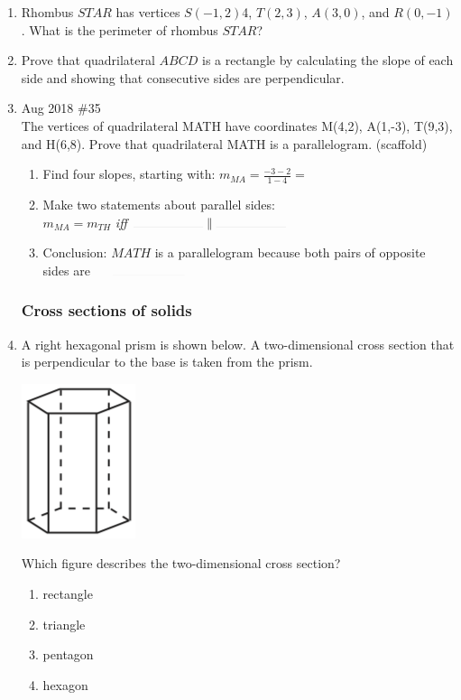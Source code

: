 \documentclass[12pt, oneside]{article}
\begin{document}
\begin{enumerate}[itemsep=0cm]
\item Rhombus $STAR$ has vertices $S(-1,2)$4, $T(2,3)$, $A(3,0)$, and $R(0,-1)$. What is the perimeter of rhombus $STAR$?
    
\item Prove that quadrilateral $ABCD$ is a rectangle by calculating the slope of each side and showing that consecutive sides are perpendicular.

\item Aug 2018 \#35\\
The vertices of quadrilateral MATH have coordinates M(4,2), A(1,-3), T(9,3), and H(6,8). Prove that quadrilateral MATH is a parallelogram.
(scaffold)
  \begin{enumerate}
    \item Find four slopes, starting with: $\displaystyle m_{MA}=\frac{-3-2}{1-4}=$
    \item Make two statements about parallel sides:\\
    $ m_{MA} = m_{TH}$ \emph{iff} $\rule{2cm}{0.015mm} \parallel \rule{2cm}{0.015mm}$ %
    \item Conclusion: $MATH$ is a parallelogram because both pairs of opposite sides are $\rule{3cm}{0.015mm}$
\end{enumerate}

\newpage	
\subsubsection*{Cross sections of solids} %
  
\item %
A right hexagonal prism is shown below. A two-dimensional cross section that is perpendicular to the base is taken from the prism.
  \begin{center}
  \includegraphics[scale=0.4]{hex-prism_JA2018.png}
  \end{center}
  Which figure describes the two-dimensional cross section?
  \begin{multicols}{2}
    \begin{enumerate}
      \item rectangle
      \item triangle
      \item pentagon
      \item hexagon
    \end{enumerate}
  \end{multicols}


\end{enumerate}
\end{document}
